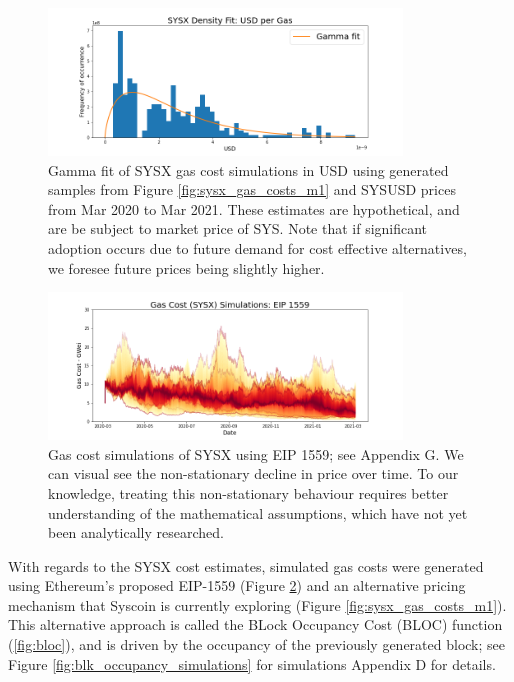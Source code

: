 \documentclass[peerreview]{ieeesyscoin}
\begin{document}
\begin{figure}[h!]
\includegraphics[width=3.7in]{img/sysx_usd_density.png}
\caption{Gamma fit of SYSX gas cost simulations in USD using generated samples from Figure \ref{fig:sysx_gas_costs_m1} and SYSUSD prices from Mar 2020 to Mar 2021. These estimates are hypothetical, and are be subject to market price of SYS. Note that if significant adoption occurs due to future demand for cost effective alternatives, we foresee future prices being slightly higher.} 
\label{fig:sysx_usd_density}
\end{figure} 

\begin{figure}[h!]
\includegraphics[width=3.7in]{img/sysx_gas_costs_eip_1559.png}
\caption{Gas cost simulations of SYSX using EIP 1559; see Appendix G. We can visual see the non-stationary decline in price over time. To our knowledge, treating this non-stationary behaviour requires better understanding of the mathematical assumptions, which have not yet been analytically researched.} 
\label{fig:sysx_gas_costs_eip_1559}
\end{figure} 

With regards to the SYSX cost estimates, simulated gas costs were generated using Ethereum's proposed EIP-1559 (Figure \ref{fig:sysx_gas_costs_eip_1559}) and an alternative pricing mechanism that Syscoin is currently exploring (Figure \ref{fig:sysx_gas_costs_m1}). This alternative approach is called the BLock Occupancy Cost (BLOC) function (\ref{fig:bloc}), and is driven by the occupancy of the previously generated block; see Figure \ref{fig:blk_occupancy_simulations} for simulations Appendix D for details.
\end{document}
